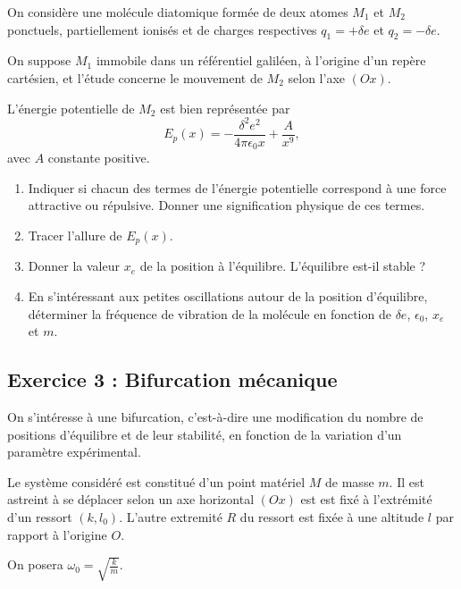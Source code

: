 On considère une molécule diatomique formée de deux atomes $M_1$ et $M_2$ ponctuels, partiellement ionisés et de charges respectives $q_1 = +\delta e$ et $q_2 = -\delta e$.

On suppose $M_1$ immobile dans un référentiel galiléen, à l'origine d'un repère cartésien, et l'étude concerne le mouvement de $M_2$ selon l'axe $(Ox)$.

L'énergie potentielle de $M_2$ est bien représentée par $$E_p(x) = -\frac{\delta^2 e^2}{4\pi\epsilon_0 x} + \frac{A}{x^9},$$ avec $A$ constante positive.

\begin{enumerate}
	\item Indiquer si chacun des termes de l'énergie potentielle correspond à une force attractive ou répulsive. Donner une signification physique de ces termes.
	\item Tracer l'allure de $E_p(x)$.
	\item Donner la valeur $x_e$ de la position à l'équilibre. L'équilibre est-il stable ?
	\item En s'intéressant aux petites oscillations autour de la position d'équilibre, déterminer la fréquence de vibration de la molécule en fonction de $\delta e$, $\epsilon_0$, $x_e$ et $m$.
\end{enumerate}

\subsection{Exercice 3 : Bifurcation mécanique}

On s'intéresse à une bifurcation, c'est-à-dire une modification du nombre de positions d'équilibre et de leur stabilité, en fonction de la variation d'un paramètre expérimental.

Le système considéré est constitué d'un point matériel $M$ de masse $m$. Il est astreint à se déplacer selon un axe horizontal $(Ox)$ est est fixé à l'extrémité d'un ressort $(k, l_0)$. L'autre extremité $R$ du ressort est fixée à une altitude $l$ par rapport à l'origine $O$.

On posera $\omega_0 = \sqrt{\frac{k}{m}}$.

